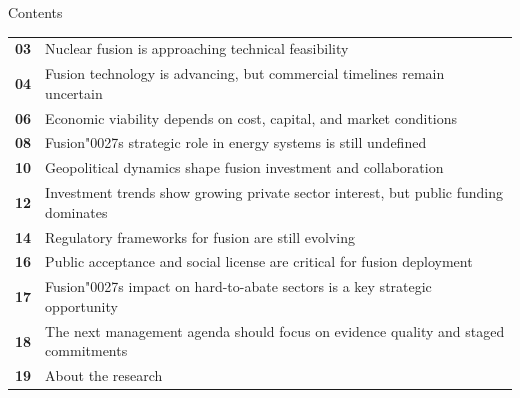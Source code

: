 \documentclass[10pt,a4paper]{article}
\newcommand{\BOApos}{{\BOQuoteFont\char"0027}}
\begin{document}
\clearpage
{\sffamily\fontsize{26}{31}\selectfont\color{BONavy} Contents}\par\vspace{10pt}
\begin{tabularx}{\linewidth}{p{14mm}Y}
\textcolor{BOGreen}{\bfseries 03} & Nuclear fusion is approaching technical feasibility \\[5pt]
\textcolor{BOGreen}{\bfseries 04} & Fusion technology is advancing, but commercial timelines remain uncertain \\[5pt]
\textcolor{BOGreen}{\bfseries 06} & Economic viability depends on cost, capital, and market conditions \\[5pt]
\textcolor{BOGreen}{\bfseries 08} & Fusion\BOApos{}s strategic role in energy systems is still undefined \\[5pt]
\textcolor{BOGreen}{\bfseries 10} & Geopolitical dynamics shape fusion investment and collaboration \\[5pt]
\textcolor{BOGreen}{\bfseries 12} & Investment trends show growing private sector interest, but public funding dominates \\[5pt]
\textcolor{BOGreen}{\bfseries 14} & Regulatory frameworks for fusion are still evolving \\[5pt]
\textcolor{BOGreen}{\bfseries 16} & Public acceptance and social license are critical for fusion deployment \\[5pt]
\textcolor{BOGreen}{\bfseries 17} & Fusion\BOApos{}s impact on hard-to-abate sectors is a key strategic opportunity \\[5pt]
\textcolor{BOGreen}{\bfseries 18} & The next management agenda should focus on evidence quality and staged commitments \\[5pt]
\textcolor{BOGreen}{\bfseries 19} & About the research \\[5pt]
\end{tabularx}
\clearpage
\end{document}
